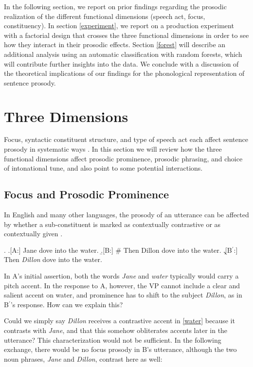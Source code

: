 \documentclass[preprint,review,12pt,authoryear,times]{elsarticle}
\begin{document}
In the following section, we report on prior findings regarding the prosodic realization of the different functional dimensions (speech act, focus, constituency). In section \ref{experiment}, we report on a production experiment with a factorial design that crosses the three functional dimensions  in order to see how they interact in their prosodic effects. Section \ref{forest} will describe an additional analysis using an automatic classification with random forests, which will contribute further insights into the data. We conclude with a discussion of the theoretical implications of our findings for the phonological representation of sentence prosody.


\section{Three Dimensions}
\label{reviewsection}

Focus, syntactic constituent structure, and type of speech act each affect sentence prosody in systematic ways \citep[][]{ladd08}. In this section we will review how the three functional dimensions affect prosodic prominence, prosodic phrasing, and choice of intonational tune, and also point to some potential interactions.


\subsection{Focus and Prosodic Prominence}

In English and many other languages, the prosody of an utterance can be affected by whether a sub-constituent is marked as contextually contrastive or as contextually given \citep[see][for a review of these notions]{krifk08}. 

\ex.\label{water}  
\a.[A:] Jane dove into the water. 
\b.[B:] \# Then Dillon dove into the water.
\c.[B$^\prime$:] Then {\em Dillon} dove into the water.

In A's initial assertion, both the words {\em Jane} and {\em water} typically would carry a pitch accent. In the response to A, however, the VP cannot include a clear and salient accent on water, and prominence has to shift to the subject {\em Dillon}, as in B$^\prime$'s response. How can we explain this? 

Could we simply say  {\em Dillon} receives a contrastive accent in \ref{water} because it contrasts with {\em Jane}, and that this somehow obliterates accents later in the utterance? This characterization would not be sufficient. In the following exchange, there would be no focus prosody in B's utterance, although the two noun phrases, {\em Jane} and {\em Dillon},  contrast here as well: 
\end{document}
